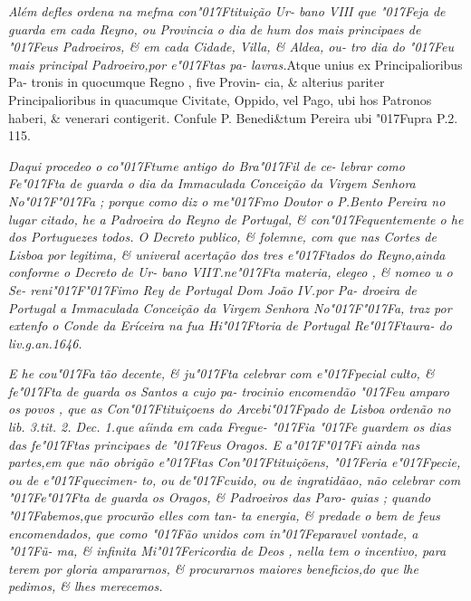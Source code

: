 \documentclass[openany,titlepage,12pt]{book}
\newcommand{\lgS}{\char"017F}
\newcommand{\lgSS}{\char"017F\char"017F}
\begin{document}
\textit{\footnotesize\hspace*{-2ex}Além defles ordena na mefma con\lgS tituição Ur-
bano VIII que \lgS eja de guarda em cada Reyno, ou
Provincia o dia de hum dos mais principaes de \lgS eus
Padroeiros, \& em cada Cidade, Villa, \& Aldea, ou-
tro dia do \lgS eu mais principal Padroeiro,por e\lgS tas pa-
lavras.}{Atque unius ex Principalioribus Pa-
tronis in quocumque Regno , five Provin-
cia, \& alterius pariter Principalioribus in
quacumque Civitate, Oppido, vel Pago, ubi
hos Patronos haberi, \& venerari contigerit.
Confule P. Benedi\&tum Pereira ubi \lgS upra
P.2. 115.}

\textit{\footnotesize\hspace*{-2ex}Daqui procedeo o co\lgS tume antigo do Bra\lgS il de ce-
lebrar como Fe\lgS ta de guarda o dia da Immaculada
Conceição da Virgem Senhora No\lgSS a ; porque como
diz o me\lgS mo Doutor o P.Bento Pereira no lugar\linebreak
citado, he a Padroeira do Reyno de Portugal, \&\linebreak
con\lgS equentemente o he dos Portuguezes todos. O\linebreak
Decreto publico, \& folemne, com que nas Cortes de
Lisboa por legitima, \& univeral acertação dos tres
e\lgS tados do Reyno,ainda conforme o Decreto de Ur-
bano VIIT.ne\lgS ta materia, elegeo , \& nomeo u o Se-
reni\lgSS imo Rey de Portugal Dom João IV.por Pa-\linebreak
droeira de Portugal a Immaculada Conceição da\linebreak
Virgem Senhora No\lgSS a, traz por extenfo o Conde\linebreak
da Eríceira na fua Hi\lgS toria de Portugal Re\lgS taura-
do liv.g.an.1646.}

\textit{\footnotesize\hspace*{-2ex}E he cou\lgS a tão decente,
\& ju\lgS ta celebrar com e\lgS pecial
culto, \& fe\lgS ta de guarda os Santos a cujo pa-\linebreak
trocinio encomendão \lgS eu amparo os povos , que as\linebreak
Con\lgS tituiçoens do Arcebi\lgS pado de Lisboa ordenão\linebreak
no lib. 3.tit. 2. Dec. 1.que aíinda em cada Fregue-
\lgS ia \lgS e guardem os dias das fe\lgS tas principaes de \lgS eus
Oragos. E a\lgSS i ainda nas partes,em que não obrigão
e\lgS tas Con\lgS tituiçõens, \lgS eria e\lgS pecie, ou de e\lgS quecimen-
to, ou de\lgS cuido, ou de ingratidãao, não celebrar com
\lgS e\lgS ta de guarda os Oragos, \& Padroeiros das Paro-
quias ; quando \lgS abemos,que procurão elles com tan-
ta energia, \& predade o bem de feus encomendados,
que como \lgS ão unidos com in\lgS eparavel vontade, a \lgS \~u-
ma, \& infinita Mi\lgS ericordia de Deos , nella tem o
incentivo, para terem por gloria ampararnos, \&\linebreak
procurarnos maiores beneficios,do que lhe pedimos,
\& lhes merecemos.}
\end{document}
